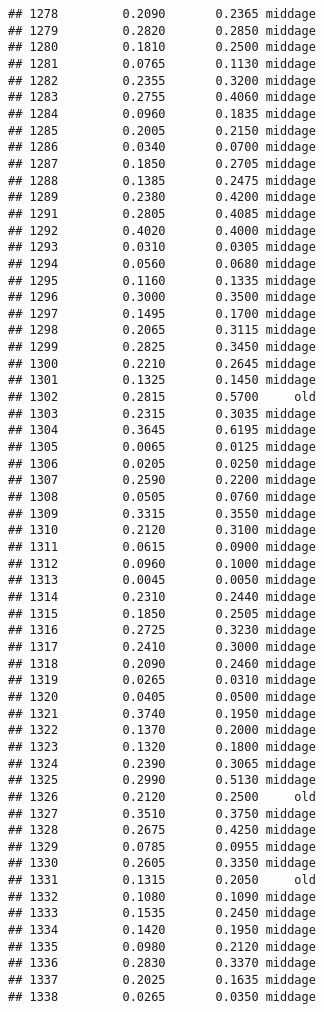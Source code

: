 \documentclass[
]{article}
\begin{document}
\begin{verbatim}
## 1278         0.2090       0.2365 middage
## 1279         0.2820       0.2850 middage
## 1280         0.1810       0.2500 middage
## 1281         0.0765       0.1130 middage
## 1282         0.2355       0.3200 middage
## 1283         0.2755       0.4060 middage
## 1284         0.0960       0.1835 middage
## 1285         0.2005       0.2150 middage
## 1286         0.0340       0.0700 middage
## 1287         0.1850       0.2705 middage
## 1288         0.1385       0.2475 middage
## 1289         0.2380       0.4200 middage
## 1291         0.2805       0.4085 middage
## 1292         0.4020       0.4000 middage
## 1293         0.0310       0.0305 middage
## 1294         0.0560       0.0680 middage
## 1295         0.1160       0.1335 middage
## 1296         0.3000       0.3500 middage
## 1297         0.1495       0.1700 middage
## 1298         0.2065       0.3115 middage
## 1299         0.2825       0.3450 middage
## 1300         0.2210       0.2645 middage
## 1301         0.1325       0.1450 middage
## 1302         0.2815       0.5700     old
## 1303         0.2315       0.3035 middage
## 1304         0.3645       0.6195 middage
## 1305         0.0065       0.0125 middage
## 1306         0.0205       0.0250 middage
## 1307         0.2590       0.2200 middage
## 1308         0.0505       0.0760 middage
## 1309         0.3315       0.3550 middage
## 1310         0.2120       0.3100 middage
## 1311         0.0615       0.0900 middage
## 1312         0.0960       0.1000 middage
## 1313         0.0045       0.0050 middage
## 1314         0.2310       0.2440 middage
## 1315         0.1850       0.2505 middage
## 1316         0.2725       0.3230 middage
## 1317         0.2410       0.3000 middage
## 1318         0.2090       0.2460 middage
## 1319         0.0265       0.0310 middage
## 1320         0.0405       0.0500 middage
## 1321         0.3740       0.1950 middage
## 1322         0.1370       0.2000 middage
## 1323         0.1320       0.1800 middage
## 1324         0.2390       0.3065 middage
## 1325         0.2990       0.5130 middage
## 1326         0.2120       0.2500     old
## 1327         0.3510       0.3750 middage
## 1328         0.2675       0.4250 middage
## 1329         0.0785       0.0955 middage
## 1330         0.2605       0.3350 middage
## 1331         0.1315       0.2050     old
## 1332         0.1080       0.1090 middage
## 1333         0.1535       0.2450 middage
## 1334         0.1420       0.1950 middage
## 1335         0.0980       0.2120 middage
## 1336         0.2830       0.3370 middage
## 1337         0.2025       0.1635 middage
## 1338         0.0265       0.0350 middage

\end{verbatim}
\end{document}
